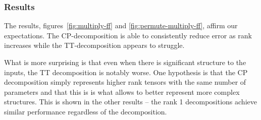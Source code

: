 \subsubsection{Results}
The results, figures~\ref{fig:multiply-ff} and \ref{fig:permute-multiply-ff}, affirm our
expectations. The CP-decomposition is able to consistently reduce error as rank increases
 while the TT-decomposition appears to struggle.

What is more surprising is that even when there is significant structure to the inputs, the
TT decomposition is notably worse. One hypothesis is that the CP decomposition simply represents
higher rank tensors with the same number of parameters and that this is is what allows to better
represent more complex structures. This is shown in the other results -- the rank 1 decompositions
achieve similar performance regardless of the decomposition.

